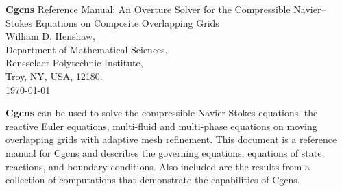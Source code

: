 \documentclass{article}
\begin{document}


\def\comma  {~~~,~~}
\newcommand{\uvd}{\mathbf{U}}
\def\ud     {{    U}}
\def\pd     {{    P}}
\def\calo{{\cal O}}

\newcommand{\mbar}{\bar{m}}
\newcommand{\Rbar}{\bar{R}}
\newcommand{\Ru}{R_u}         %
\newcommand{\Div}{\grad\cdot}
\newcommand{\tauv}{\boldsymbol{\tau}}
\newcommand{\thetav}{\boldsymbol{\theta}}

\newcommand{\Omegav}{\boldsymbol{\Omega}}
\newcommand{\omegav}{\boldsymbol{\omega}}
\newcommand{\cm}{{\rm cm}}

\newcommand{\sumi}{\sum_{i=1}^n}
\newcommand{\dt}{{\Delta t}}

\def\ff {\tt} %
\newcommand{\Ic}{{\mathcal I}}
\newcommand{\Rc}{{\mathcal R}}
\newcommand{\Gc}{{\mathcal G}}


\vspace{5\baselineskip}
\begin{flushleft}
{\Large
{\bf Cgcns} Reference Manual: An Overture Solver for the Compressible Navier--Stokes Equations 
  on Composite Overlapping Grids \\
}
\vspace{2\baselineskip}
William D. Henshaw,\\
Department of Mathematical Sciences, \\
Rensselaer Polytechnic Institute, \\
Troy, NY, USA, 12180. \\
\vspace{\baselineskip}
\today\\
\vspace{\baselineskip}

\vspace{4\baselineskip}


{\bf Cgcns} can be used 
to solve the compressible Navier-Stokes equations, the reactive Euler equations,
multi-fluid and multi-phase equations on moving overlapping grids with
adaptive mesh refinement.
This document is a reference manual for Cgcns and
describes the governing equations, equations of state, reactions,
and boundary conditions. Also included are the results from a 
collection of computations that demonstrate the capabilities of Cgcns.



\end{flushleft}
\end{document}
